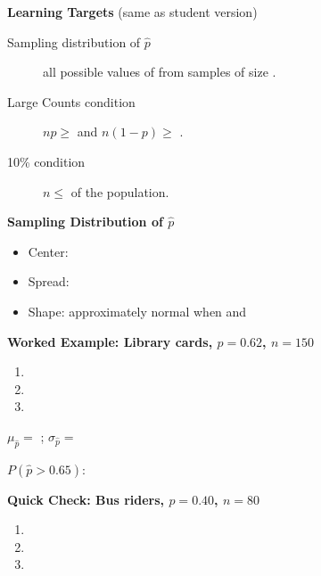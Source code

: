 \documentclass[10pt]{article}
\begin{document}
\namedateperiod

\vspace{0.1in}

\begin{objectivebox}
\textbf{Learning Targets} (same as student version)
\end{objectivebox}

\begin{vocabbox}
\begin{description}
  \item[Sampling distribution of $\hat{p}$] all possible values of  from samples of size .
  \item[Large Counts condition] $np \ge$  and $n(1-p) \ge$ .
  \item[10\% condition] $n \le$  of the population.
\end{description}
\end{vocabbox}

\begin{notesbox}
\textbf{Sampling Distribution of $\hat{p}$}
\begin{itemize}
  \item Center: 
  \item Spread: 
  \item Shape: approximately normal when  and 
\end{itemize}
\end{notesbox}

\begin{notesbox}
\textbf{Worked Example: Library cards, $p = 0.62$, $n = 150$}
\begin{enumerate}
  \item {}
  \item {}
  \item {}
\end{enumerate}
$\mu_{\hat{p}} = $ ; $\sigma_{\hat{p}} = $ 

$P(\hat{p} > 0.65)$: 
\end{notesbox}

\begin{practicebox}
\textbf{Quick Check: Bus riders, $p = 0.40$, $n = 80$}
\begin{enumerate}
  \item {}
  \item {}
  \item {}
\end{enumerate}
\end{practicebox}
\end{document}
